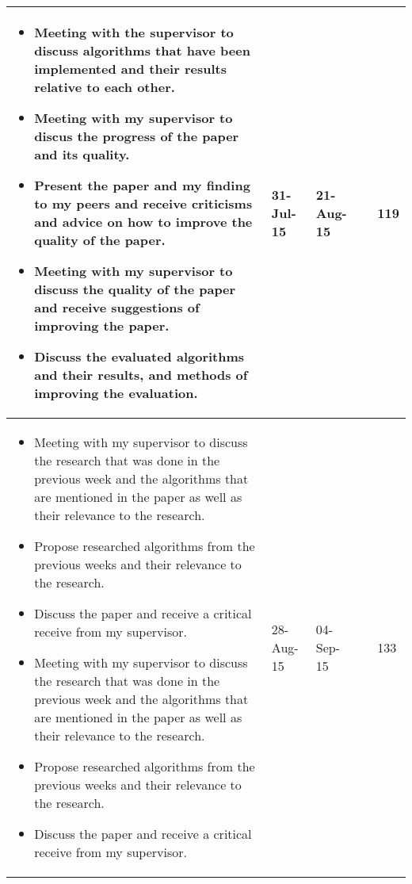 \begin{longtable}{|>{\raggedleft\arraybackslash}m{50mm}|m{10mm}|m{10mm}|m{10mm}|m{30mm}|}
			\hline
				\begin{itemize}                                                                                                                                                                                    
					\item Meeting with the supervisor to discuss algorithms that have been implemented and their results relative to each other.
					\item Meeting with my supervisor to discus the progress of the paper and its quality.                                                                                                                             
					\item Present the paper and my finding to my peers and receive criticisms and advice on how to improve the quality of the paper.                                                                                  
					\item Meeting with my supervisor to discuss the quality of the paper and receive suggestions of improving the paper.                                                                                              
					\item Discuss the evaluated algorithms and their results, and methods of improving the evaluation.
				\end{itemize} & 31-Jul-15  & 21-Aug-15 &                & 119\\
			\hline
                    

			\hline
				\begin{itemize}                                                                                                                                                                                    
					\item Meeting with my supervisor to discuss the research that was done in the previous week and the algorithms that are mentioned in the paper as well as their relevance to the research.            
					\item Propose researched algorithms from the previous weeks and their relevance to the research.                                                                                                      
					\item Discuss the paper and receive a critical receive from my supervisor.                                                                                                                            
					\item Meeting with my supervisor to discuss the research that was done in the previous week and the algorithms that are mentioned in the paper as well as their relevance to the research.            
					\item Propose researched algorithms from the previous weeks and their relevance to the research. 
					\item Discuss the paper and receive a critical receive from my supervisor. 
				\end{itemize}  & 28-Aug-15  & 04-Sep-15 &                & 133\\
			\hline
                       

\end{longtable}
